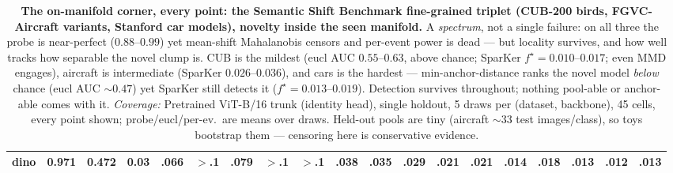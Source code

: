 \begin{table}[t]
\begin{tabular}{lcccccccccccccccccc}
\quad dino & 0.971 & 0.472 & 0.03 & .066 & $>$.1 & .079 & $>$.1 & $>$.1 & .038 & .035 & .029 & .021 & .021 & .014 & .018 & .013 & .012 & .013 \\
\bottomrule
\end{tabular}
\caption{\textbf{The on-manifold corner, every point: the Semantic Shift Benchmark fine-grained triplet (CUB-200 birds, FGVC-Aircraft variants, Stanford car models), novelty inside the seen manifold.}  A \emph{spectrum}, not a single failure: on all three the probe is near-perfect ($0.88$--$0.99$) yet mean-shift Mahalanobis censors and per-event power is dead --- but locality survives, and how well tracks how separable the novel clump is.  CUB is the mildest (eucl AUC $0.55$--$0.63$, above chance; SparKer $f^\star{=}0.010$--$0.017$; even MMD engages), aircraft is intermediate (SparKer $0.026$--$0.036$), and cars is the hardest --- min-anchor-distance ranks the novel model \emph{below} chance (eucl AUC $\sim$$0.47$) yet SparKer still detects it ($f^\star{=}0.013$--$0.019$).  Detection survives throughout; nothing pool-able or anchor-able comes with it. \emph{Coverage:} Pretrained ViT-B/16 trunk (identity head), single holdout, 5 draws per (dataset, backbone), 45 cells, every point shown; probe/eucl/per-ev.\ are means over draws.  Held-out pools are tiny (aircraft $\sim$33 test images/class), so toys bootstrap them --- censoring here is conservative evidence.}
\label{tab:sigma_onmanifold}
\end{table}

